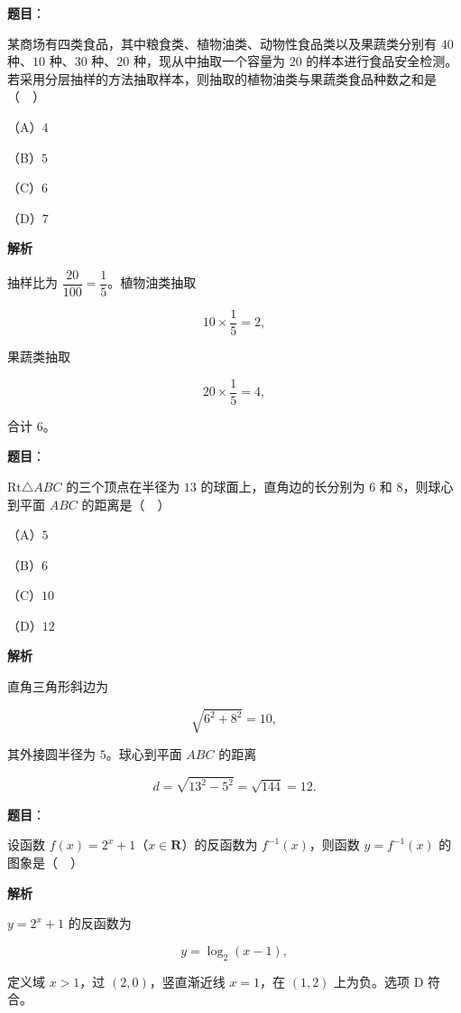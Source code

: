 \begin{answer}

\textbf{题目}：

某商场有四类食品，其中粮食类、植物油类、动物性食品类以及果蔬类分别有 $40$ 种、$10$ 种、$30$ 种、$20$ 种，现从中抽取一个容量为 $20$ 的样本进行食品安全检测。若采用分层抽样的方法抽取样本，则抽取的植物油类与果蔬类食品种数之和是（　）

（A）$4$

（B）$5$

（C）$6$

（D）$7$

\textbf{解析}

抽样比为 $\dfrac{20}{100}=\dfrac15$。植物油类抽取

\nopagebreak[4]
\[10\times\frac15=2,\]

果蔬类抽取

\nopagebreak[4]
\[20\times\frac15=4,\]

合计 $6$。


\end{answer}
\begin{answer}

\textbf{题目}：

$\mathrm{Rt}\triangle ABC$ 的三个顶点在半径为 $13$ 的球面上，直角边的长分别为 $6$ 和 $8$，则球心到平面 $ABC$ 的距离是（　）

（A）$5$

（B）$6$

（C）$10$

（D）$12$

\textbf{解析}

直角三角形斜边为

\nopagebreak[4]
\[\sqrt{6^2+8^2}=10,\]

其外接圆半径为 $5$。球心到平面 $ABC$ 的距离

\nopagebreak[4]
\[d=\sqrt{13^2-5^2}=\sqrt{144}=12.\]


\end{answer}
\begin{answer}

\textbf{题目}：

设函数 $f(x)=2^x+1$（$x\in\mathbf R$）的反函数为 $f^{-1}(x)$，则函数 $y=f^{-1}(x)$ 的图象是（　）
\nopagebreak[4]
\begin{center}\end{center}
\nopagebreak[4]
\textbf{解析}

$y=2^x+1$ 的反函数为

\nopagebreak[4]
\[y=\log_2(x-1),\]

定义域 $x>1$，过 $(2,0)$，竖直渐近线 $x=1$，在 $(1,2)$ 上为负。选项 D 符合。


\end{answer}
